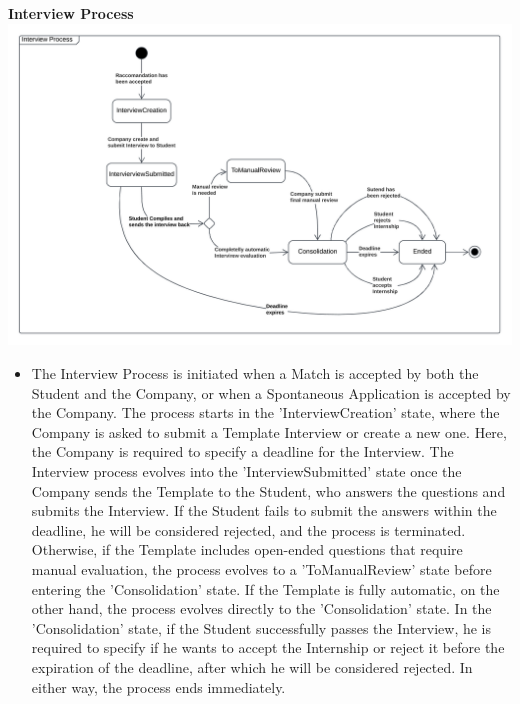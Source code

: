 \textbf{Interview Process}\\
\includegraphics[width=1 \textwidth]{Images/InterviewStateChart.png}
\begin{itemize}
    \item The Interview Process is initiated when a Match is accepted by both the Student and the Company, or when a Spontaneous Application is accepted by the Company. The process starts in the 'InterviewCreation' state, where the Company is asked to submit a Template Interview or create a new one. Here, the Company is required to specify a deadline for the Interview. The Interview process evolves into the 'InterviewSubmitted' state once the Company sends the Template to the Student, who answers the questions and submits the Interview. If the Student fails to submit the answers within the deadline, he will be considered rejected, and the process is terminated. Otherwise, if the Template includes open-ended questions that require manual evaluation, the process evolves to a 'ToManualReview' state before entering the 'Consolidation' state. If the Template is fully automatic, on the other hand, the process evolves directly to the 'Consolidation' state. In the 'Consolidation' state, if the Student successfully passes the Interview, he is required to specify if he wants to accept the Internship or reject it before the expiration of the deadline, after which he will be considered rejected. In either way, the process ends immediately.
\end{itemize}


